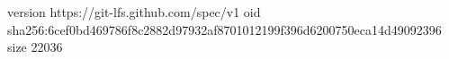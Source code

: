 version https://git-lfs.github.com/spec/v1
oid sha256:6cef0bd469786f8c2882d97932af8701012199f396d6200750eca14d49092396
size 22036
